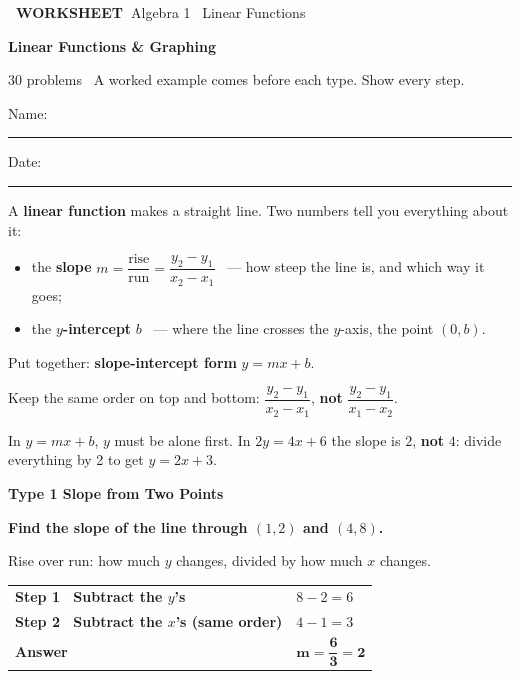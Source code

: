 \documentclass[11pt,letterpaper]{article}
\newcommand{\badge}[1]{\colorbox{fmtitle}{\color{white}\bfseries\small\ #1\ }}
\newcommand{\topicbar}[1]{\needspace{4.5cm}\par\vspace{5mm}
  \begin{tcolorbox}[enhanced,colback=fmtitle,colframe=fmtitle,arc=2mm,left=4mm,top=1.5mm,bottom=1.5mm]
  \color{white}\bfseries\large #1
  \end{tcolorbox}}
\begin{document}
\badge{WORKSHEET}\hfill{\small\color{fmgray}Algebra 1 \textperiodcentered\ Linear Functions}\par\vspace{4mm}
{\color{fmtitle}\LARGE\bfseries Linear Functions \& Graphing}\par\vspace{1mm}
{\color{fmgray}30 problems \textperiodcentered\ A worked example comes before each type. Show every step.}\par\vspace{3mm}
Name: \rule{6cm}{0.4pt}\hspace{1cm}Date: \rule{3.5cm}{0.4pt}\par\vspace{1mm}

\begin{keyidea}A \textbf{linear function} makes a straight line. Two numbers tell you everything about it:
\begin{itemize}[itemsep=1pt,topsep=2pt]
\item the \textbf{slope} $m = \dfrac{\text{rise}}{\text{run}} = \dfrac{y_2 - y_1}{x_2 - x_1}$ \ --- how steep the line is, and which way it goes;
\item the \textbf{$y$-intercept} $b$ \ --- where the line crosses the $y$-axis, the point $(0, b)$.
\end{itemize}
Put together: \textbf{slope-intercept form} $y = mx + b$.\end{keyidea}
\begin{mistakebox}Keep the same order on top and bottom: $\dfrac{y_2 - y_1}{x_2 - x_1}$, \textbf{not} $\dfrac{y_2 - y_1}{x_1 - x_2}$.\par
In $y = mx + b$, $y$ must be alone first. In $2y = 4x + 6$ the slope is $2$, \textbf{not} $4$: divide everything by 2 to get $y = 2x + 3$.\end{mistakebox}
\needspace{9cm}\topicbar{Type 1 \quad Slope from Two Points}
\begin{watchme}\textbf{Find the slope of the line through $(1, 2)$ and $(4, 8)$.}\par\vspace{1mm}Rise over run: how much $y$ changes, divided by how much $x$ changes.\par\vspace{1mm}
\renewcommand{\arraystretch}{2.0}\begin{tabular}{@{}l l@{}}
\textbf{Step 1 \ Subtract the $y$'s} & $8 - 2 = 6$\\
\textbf{Step 2 \ Subtract the $x$'s (same order)} & $4 - 1 = 3$\\
\textbf{Answer} & $\boldsymbol{m = \dfrac{6}{3} = 2}$
\end{tabular}\end{watchme}
\end{document}

